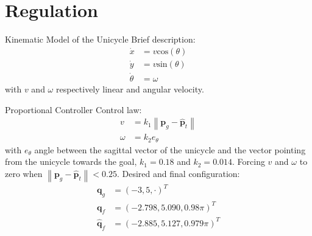 \documentclass[10pt]{beamer}
\begin{document}
    \section{Regulation}

    \begin{frame}{Kinematic Model of the Unicycle}
        Brief description:
        \begin{align*}
            \dot{x} &= v \text{cos}(\theta) \\
            \dot{y} &= v \text{sin}(\theta) \\
            \dot{\theta} &= \omega
        \end{align*}
        with $v$ and $\omega$ respectively linear and angular velocity.
    \end{frame}

    \begin{frame}{Proportional Controller}
        \justifying
        Control law:
        \begin{align*}
            v &= k_1 \left\| \bm{p}_g - \bm{\hat{p}}_t \right\| \\
            \omega &= k_2 e_{\theta}
        \end{align*}
        with $e_\theta$ angle between the sagittal vector of the unicycle
        and the vector pointing from the unicycle towards the goal, $k_1 =
        0.18$ and $k_2 = 0.014$. Forcing $v$ and $\omega$ to zero when
        $\left\|\bm{p}_g - \bm{\hat{p}}_t \right\| < 0.25$.
        Desired and final configuration:
        \begin{align*}
            \bm{q}_g &= (-3, 5, \cdot)^T \\
            \bm{q}_f &= (-2.798, 5.090, 0.98\pi)^T \\
            \bm{\hat{q}}_f &= (-2.885, 5.127, 0.979\pi)^T
        \end{align*}
    \end{frame}

\end{document}
